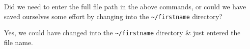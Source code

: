 \begin{questions}
Did we need to enter the full file path in the above commands, or could we have saved ourselves some effort by changing into the \texttt{\~{}/firstname} directory? \\
\begin{answer}
Yes, we could have changed into the \texttt{\~{}/firstname} directory \& just entered the file name. \\
\end{answer}
\end{questions}